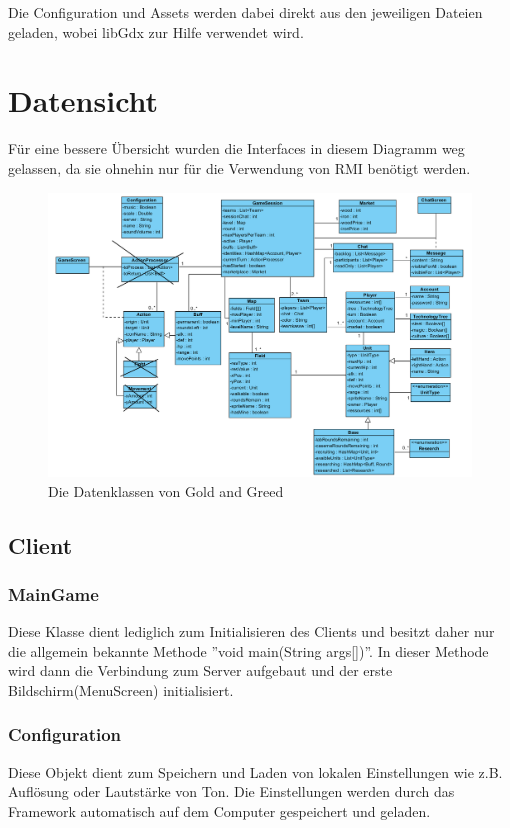 \documentclass[fontsize=12pt,paper=a4,twoside]{scrartcl}
\begin{document}
Die Configuration und Assets werden dabei direkt aus den jeweiligen Dateien geladen, wobei libGdx zur Hilfe verwendet wird.

\section{Datensicht}
\label{sec:datensicht}

Für eine bessere Übersicht wurden die Interfaces in diesem Diagramm weg gelassen, da sie ohnehin nur für die Verwendung von RMI benötigt werden.

\begin{figure}[h]
\centering
\includegraphics[width=1.0\linewidth]{DatensichtForReal}
\caption{Die Datenklassen von Gold and Greed}
\label{fig:ClassDiagram1}
\end{figure}

\subsection{Client}

\subsubsection{MainGame}

Diese Klasse dient lediglich zum Initialisieren des Clients und besitzt daher nur die allgemein bekannte Methode ''void main(String args[])''. In dieser Methode wird dann die Verbindung zum Server aufgebaut und der erste Bildschirm(MenuScreen) initialisiert.

\subsubsection{Configuration}
Diese Objekt dient zum Speichern und Laden von lokalen Einstellungen wie z.B. Auflösung oder Lautstärke von Ton. Die Einstellungen werden durch das Framework automatisch auf dem Computer gespeichert und geladen.
\end{document}
